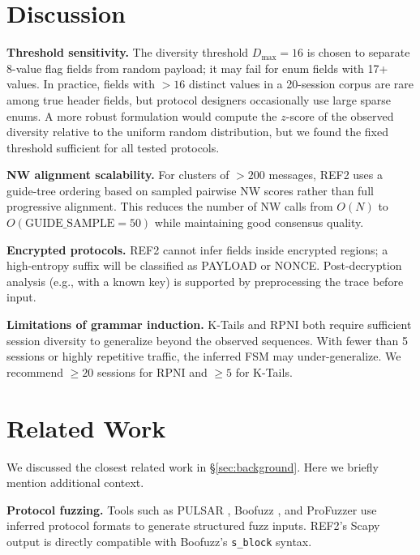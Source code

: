 \documentclass[letterpaper,twocolumn,10pt]{article}
\begin{document}
\section{Discussion}
\label{sec:discussion}

\textbf{Threshold sensitivity.}  The diversity threshold $D_\text{max} = 16$
is chosen to separate 8-value flag fields from random payload; it may fail for
enum fields with 17+ values.  In practice, fields with $> 16$ distinct values
in a 20-session corpus are rare among true header fields, but protocol designers
occasionally use large sparse enums.  A more robust formulation would compute
the $z$-score of the observed diversity relative to the uniform random
distribution, but we found the fixed threshold sufficient for all tested
protocols.

\textbf{NW alignment scalability.}  For clusters of $> 200$ messages,
\textsc{REF2} uses a guide-tree ordering based on sampled pairwise NW scores
rather than full progressive alignment.  This reduces the number of NW calls
from $O(N)$ to $O(\text{GUIDE\_SAMPLE} = 50)$ while maintaining good consensus
quality.

\textbf{Encrypted protocols.}  \textsc{REF2} cannot infer fields inside
encrypted regions; a high-entropy suffix will be classified as PAYLOAD or NONCE.
Post-decryption analysis (e.g., with a known key) is supported by preprocessing
the trace before input.

\textbf{Limitations of grammar induction.}  K-Tails and RPNI both require
sufficient session diversity to generalize beyond the observed sequences.  With
fewer than 5 sessions or highly repetitive traffic, the inferred FSM may
under-generalize.  We recommend $\geq 20$ sessions for RPNI and $\geq 5$ for
K-Tails.

\section{Related Work}
\label{sec:related}

We discussed the closest related work in \S\ref{sec:background}.  Here we
briefly mention additional context.

\textbf{Protocol fuzzing.}  Tools such as PULSAR \cite{pulsar},
Boofuzz \cite{boofuzz}, and ProFuzzer \cite{profuzzer} use inferred protocol
formats to generate structured fuzz inputs.  \textsc{REF2}'s Scapy output is
directly compatible with Boofuzz's \texttt{s\_block} syntax.
\end{document}
